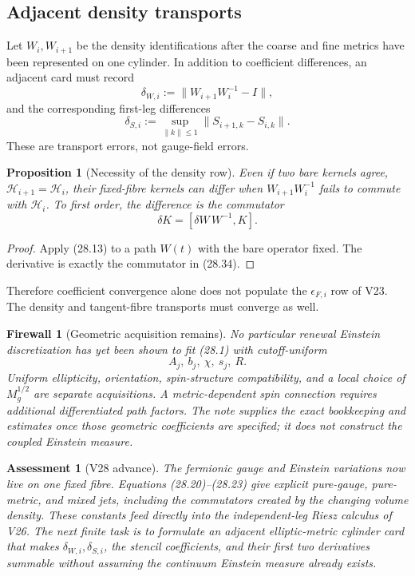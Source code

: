 \documentclass[11pt]{article}
\newtheorem{proposition}[theorem]{Proposition}
\newtheorem{assessment}[theorem]{Assessment}
\newtheorem{firewall}[theorem]{Firewall}
\begin{document}
\subsection{Adjacent density transports}

Let \(W_i,W_{i+1}\) be the density identifications after the coarse and
fine metrics have been represented on one cylinder.  In addition to
coefficient differences, an adjacent card must record
\[
 \delta_{W,i}:=
 \|W_{i+1}W_i^{-1}-I\|,
 \tag{28.32}
\]
and the corresponding first-leg differences
\[
 \delta_{S,i}:=
 \sup_{\|k\|\leq1}
 \|S_{i+1,k}-S_{i,k}\|.
 \tag{28.33}
\]
These are transport errors, not gauge-field errors.

\begin{proposition}[Necessity of the density row]
\label{prop:v11v28-density-row}
Even if two bare kernels agree,
\(\mathscr H_{i+1}=\mathscr H_i\), their fixed-fibre kernels can differ
when \(W_{i+1}W_i^{-1}\) fails to commute with \(\mathscr H_i\).
To first order, the difference is the commutator
\[
 \delta K=[\delta W\,W^{-1},K].
 \tag{28.34}
\]
\end{proposition}

\begin{proof}
Apply (28.13) to a path \(W(t)\) with the bare operator fixed.
The derivative is exactly the commutator in (28.34).
\end{proof}

Therefore coefficient convergence alone does not populate the
\(\epsilon_{F,i}\) row of V23.  The density and tangent-fibre transports
must converge as well.

\begin{firewall}[Geometric acquisition remains]
\label{fw:v11v28-geometric}
No particular renewal Einstein discretization has yet been shown to fit
(28.1) with cutoff-uniform
\[
 A_j,\ b_j,\ \chi,\ s_j,\ R.
\]
Uniform ellipticity, orientation, spin-structure compatibility, and a
local choice of \(M_g^{1/2}\) are separate acquisitions.  A
metric-dependent spin connection requires additional differentiated
path factors.  The note supplies the exact bookkeeping and estimates
once those geometric coefficients are specified; it does not construct
the coupled Einstein measure.
\end{firewall}

\begin{assessment}[V28 advance]
\label{ass:v11v28}
The fermionic gauge and Einstein variations now live on one fixed fibre.
Equations (28.20)--(28.23) give explicit pure-gauge, pure-metric, and
mixed jets, including the commutators created by the changing volume
density.  These constants feed directly into the independent-leg Riesz
calculus of V26.  The next finite task is to formulate an adjacent
elliptic-metric cylinder card that makes
\(\delta_{W,i},\delta_{S,i}\), the stencil coefficients, and their first
two derivatives summable without assuming the continuum Einstein
measure already exists.
\end{assessment}
\end{document}
